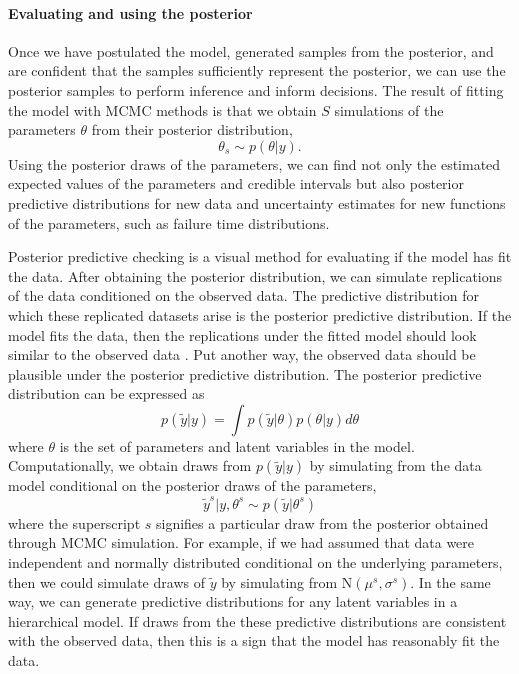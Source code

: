 \paragraph*{Evaluating and using the posterior}

Once we have postulated the model, generated samples from the posterior, and are confident that the samples sufficiently represent the posterior, we can use the posterior samples to perform inference and inform decisions. The result of fitting the model with MCMC methods is that we obtain $S$ simulations of the parameters $\theta$ from their posterior distribution,
\begin{equation}
  \theta_s \sim p(\theta|y).
\end{equation}
Using the posterior draws of the parameters, we can find not only the estimated expected values of the parameters and credible intervals but also posterior predictive distributions for new data and uncertainty estimates for new functions of the parameters, such as failure time distributions.

Posterior predictive checking \citep{BDA2020} is a visual method for evaluating if the model has fit the data. After obtaining the posterior distribution, we can simulate replications of the data conditioned on the observed data. The predictive distribution for which these replicated datasets arise is the posterior predictive distribution. If the model fits the data, then the replications under the fitted model should look similar to the observed data \citep[pp.~143]{BDA2020}. Put another way, the observed data should be plausible under the posterior predictive distribution. The posterior predictive distribution can be expressed as
\begin{equation}
 p(\tilde{y}|y) = \int p(\tilde{y}|\theta)p(\theta|y)d\theta
\end{equation}
where $\theta$ is the set of parameters and latent variables in the model. Computationally, we obtain draws from $p(\tilde{y}|y)$ by simulating from the data model conditional on the posterior draws of the parameters,
\begin{equation}
 \tilde{y}^s|y, \theta^s \sim p(\tilde{y}|\theta^s)
\end{equation}
where the superscript $s$ signifies a particular draw from the posterior obtained through MCMC simulation. For example, if we had assumed that data were independent and normally distributed conditional on the underlying parameters, then we could simulate draws of $\tilde{y}$ by simulating from $\mbox{N}(\mu^s, \sigma^s)$. In the same way, we can generate predictive distributions for any latent variables in a hierarchical model. If draws from the these predictive distributions are consistent with the observed data, then this is a sign that the model has reasonably fit the data.

